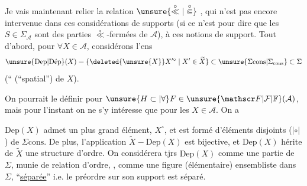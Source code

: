 
Je vais maintenant relier la relation $\unsure{\overset{\circ}{\ll}|\overset{\circ}{\Subset}}$ , qui n'est pas encore intervenue dans ces considérations de supports (si ce n'est pour dire que les $S\in\Sigma_{\mathcal A}$ sont des parties $\overset{\circ}{\ll}$-fermées de $\mathcal A$), à ces notions de support. Tout d'abord, pour $\forall X\in\mathcal A$, considérons  l'ens
\[
\unsure{\mathrm{Dep}|\mathrm{D\acute{e}p}}(X)=\{\deleted{\unsure{X}}X^{\prime\circ}\mid X'\in\widetilde X\}\subset\unsure{\Sigma\mathrm{cons}|\Sigma_{\mathrm{cons}}}\subset\Sigma
\]
(``\uline{} (``spatial'') de $X$).

On pourrait le définir pour $\unsure{H\subset|\forall}F\in\unsure{\mathscr F|\mathcal F|\mathbb F}(\mathcal A)$, mais pour l'instant on ne s'y intéresse que pour les $X\in\mathcal A$. On a

$\mathrm{Dep}(X)$ admet un plus grand élément, $X^{\circ}$, et est formé d'éléments \inserted{$\ne\varnothing_\Sigma$,}  disjoints ($\mathrel{|\circ|}$) de $\Sigma\mathrm{cons}$. De plus, l'application $\widetilde X\mathbin{-}\mathrm{Dep}(X)$ est bijective, et $\mathrm{Dep}(X)$ hérite de $\widetilde X$ une structure d'ordre. On considérera tjrs $\mathrm{Dep}(X)$ comme une partie de $\Sigma$, munie de   relation d'ordre, , comme une figure (élémentaire) ensembliste dans $\Sigma$, ``\uline{séparée}'' i.e. le préordre sur son support est séparé.
